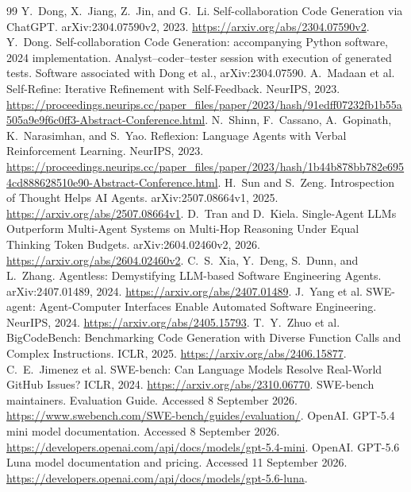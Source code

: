 \begin{thebibliography}{99}
 Y.~Dong, X.~Jiang, Z.~Jin, and G.~Li. Self-collaboration Code Generation via ChatGPT. arXiv:2304.07590v2, 2023. \url{https://arxiv.org/abs/2304.07590v2}.
 Y.~Dong. Self-collaboration Code Generation: accompanying Python software, 2024 implementation. Analyst--coder--tester session with execution of generated tests. Software associated with Dong et al., arXiv:2304.07590.
 A.~Madaan et al. Self-Refine: Iterative Refinement with Self-Feedback. NeurIPS, 2023. \url{https://proceedings.neurips.cc/paper_files/paper/2023/hash/91edff07232fb1b55a505a9e9f6c0ff3-Abstract-Conference.html}.
 N.~Shinn, F.~Cassano, A.~Gopinath, K.~Narasimhan, and S.~Yao. Reflexion: Language Agents with Verbal Reinforcement Learning. NeurIPS, 2023. \url{https://proceedings.neurips.cc/paper_files/paper/2023/hash/1b44b878bb782e6954cd888628510e90-Abstract-Conference.html}.
 H.~Sun and S.~Zeng. Introspection of Thought Helps AI Agents. arXiv:2507.08664v1, 2025. \url{https://arxiv.org/abs/2507.08664v1}.
 D.~Tran and D.~Kiela. Single-Agent LLMs Outperform Multi-Agent Systems on Multi-Hop Reasoning Under Equal Thinking Token Budgets. arXiv:2604.02460v2, 2026. \url{https://arxiv.org/abs/2604.02460v2}.
 C.~S.~Xia, Y.~Deng, S.~Dunn, and L.~Zhang. Agentless: Demystifying LLM-based Software Engineering Agents. arXiv:2407.01489, 2024. \url{https://arxiv.org/abs/2407.01489}.
 J.~Yang et al. SWE-agent: Agent-Computer Interfaces Enable Automated Software Engineering. NeurIPS, 2024. \url{https://arxiv.org/abs/2405.15793}.
 T.~Y.~Zhuo et al. BigCodeBench: Benchmarking Code Generation with Diverse Function Calls and Complex Instructions. ICLR, 2025. \url{https://arxiv.org/abs/2406.15877}.
 C.~E.~Jimenez et al. SWE-bench: Can Language Models Resolve Real-World GitHub Issues? ICLR, 2024. \url{https://arxiv.org/abs/2310.06770}.
 SWE-bench maintainers. Evaluation Guide. Accessed 8 September 2026. \url{https://www.swebench.com/SWE-bench/guides/evaluation/}.
 OpenAI. GPT-5.4 mini model documentation. Accessed 8 September 2026. \url{https://developers.openai.com/api/docs/models/gpt-5.4-mini}.
 OpenAI. GPT-5.6 Luna model documentation and pricing. Accessed 11 September 2026. \url{https://developers.openai.com/api/docs/models/gpt-5.6-luna}.

\end{thebibliography}
